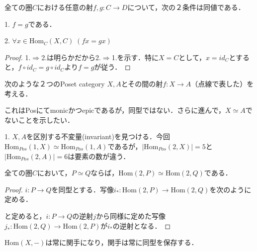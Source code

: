 \documentclass[uplatex, dvipdfmx]{jsarticle}
\begin{document}
\begin{proposition*}
    全ての圏$C$における任意の射$f,g:C\to D$について，次の２条件は同値である．
    
    1. $f=g$である．

    2. $\forall x\in\mathrm{Hom}_C(X,C)\; (fx=gx)$
\end{proposition*}
\begin{proof}
    1.$\Rightarrow$2.は明らかだから2.$\Rightarrow$1.を示す．特に$X=C$として，$x=id_C$とすると，$f\circ id_C=g\circ id_C$より$f=g$が従う．
\end{proof}

\begin{example}\label{example-generalized-elements}
    次のような２つのPoset category $X,A$とその間の射$f:X\to A$（点線で表した）を考える．
    \begin{center}
    \end{center}
    これはPosにてmonicかつepicであるが，同型ではない．さらに進んで，$X\simeq A$でないことを示したい．

    1. $X,A$を区別する不変量(invariant)を見つける．今回$\mathrm{Hom}_{Pos}(1,X)\simeq\mathrm{Hom}_{Pos}(1,A)$であるが，$|\mathrm{Hom}_{Pos}(2,X)|=5$と$|\mathrm{Hom}_{Pos}(2,A)|=6$は要素の数が違う．
    \begin{proposition*}
        全ての圏$C$において，$P\simeq Q$ならば，$\mathrm{Hom}(2,P)\simeq\mathrm{Hom}(2,Q)$である．
    \end{proposition*}
    \begin{proof}
        $i:P\to Q$を同型とする．写像$i_*:\mathrm{Hom}(2,P)\to\mathrm{Hom}(2,Q)$を次のように定める．
        \begin{center}
        \end{center}
        と定めると，$i:P\to Q$の逆射$j$から同様に定めた写像$j_*:\mathrm{Hom}(2,Q)\to\mathrm{Hom}(2,P)$が$i_*$の逆射となる．
    \end{proof}
    \begin{remark*}
        $\mathrm{Hom}(X,-)$は常に関手になり，関手は常に同型を保存する．
    \end{remark*}
\end{example}
\end{document}
